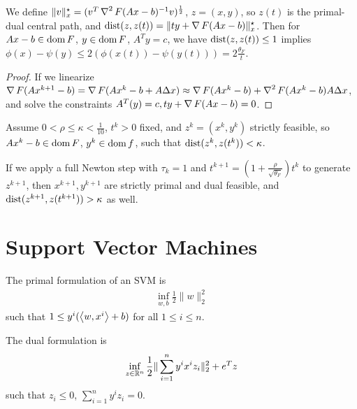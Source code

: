 \begin{thm}
  \label{sec:inter-point-meth-5}
  We define $\| v \|_{x}^{\star} = (v^{T} \operatorname{\nabla}^{2} F(Ax - b)^{-1}
  v)^{\frac{1}{2}}$, $z = (x, y)$, so $z(t)$ is the primal-dual
  central path, and $\operatorname*{dist}(z, z(t)) = \| ty + \operatorname{\nabla} F(Ax -
  b)\|_{x}^{\star}$.
  Then for $Ax - b \in \operatorname*{dom} F$, $y \in \operatorname*{dom} F$, $A^{T}y = c$, we have
  $\operatorname*{dist}(z, z(t)) \leq 1$ implies $\phi(x) - \psi(y) \leq 2(\phi(x(t))
  - \psi(y(t))) = 2 \frac{\theta_{F}}{t}$.
\end{thm}

\begin{proof}
  If we linearize $\operatorname{\nabla} F(Ax^{k+1} - b) = \operatorname{\nabla} F(Ax^{k} - b + A
  \Delta x) \approx \operatorname{\nabla} F(A x^{k} - b) + \operatorname{\nabla}^{2} F(Ax^{k} - b) A
  \Delta x$, and solve the constraints $A^{T}(y) = c, ty + \operatorname{\nabla} F(Ax
  - b) = 0$.
\end{proof}

\begin{thm}
  \label{sec:inter-point-meth-6}
  Assume $0 < \rho \leq \kappa < \frac{1}{10}$, $t^{k} > 0$ fixed, and
  $z^{k} = (x^{k}, y^{k})$ strictly feasible, so $Ax^{k} - b \in \operatorname*{dom}
  F$, $y^{k} \in \operatorname*{dom} f$, such that $\operatorname*{dist}(z^{k}, z(t^{k})) < \kappa$.

  If we apply a full Newton step with $\tau_{k} = 1$ and $t^{k+1} = (1
  + \frac{\rho}{\sqrt{\theta_{F}}}) t^{k}$ to generate $z^{k+1}$, then
  $x^{k+1}, y^{k+1}$ are strictly primal and dual feasible, and
  $\operatorname*{dist}(z^{k+1}, z(t^{k+1})) > \kappa$ as well.
\end{thm}

\section{Support Vector Machines}
\label{sec:supp-vect-mach}

\begin{defn}
  \label{sec:supp-vect-mach-1}
  The primal formulation of an SVM is
  \begin{align}
    \label{eq:18}
    \inf_{w, b} \frac{1}{2} \| w \|_{2}^{2}
  \end{align} such that $1 \leq y^{i} (\IP{w, x^{i}} + b)$ for all $1
  \leq i \leq n$.

  The dual formulation is
  \begin{align}
    \label{eq:48}
    \inf_{z \in \mathbb{R}^{n}} \frac{1}{2} \| \sum_{i=1}^{n} y^{i} x^{i}
    z_{i} \|_{2}^{2} + e^{T} z
  \end{align} such that $z_{i} \leq 0$, $\sum_{i=1}^{n} y^{i} z_{i} = 0$.
\end{defn}

